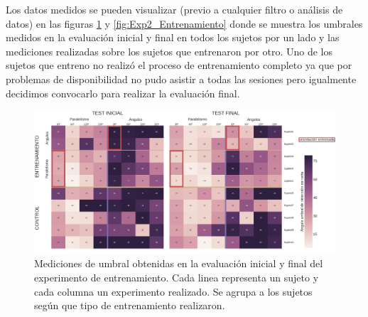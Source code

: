 \documentclass{article}
\begin{document}
    Los datos medidos se pueden visualizar (previo a cualquier filtro o análisis de datos) en las figuras \ref{fig:Exp2_Test} y \ref{fig:Exp2_Entrenamiento} donde se muestra los umbrales medidos en la evaluación inicial y final en todos los sujetos por un lado y las mediciones realizadas sobre los sujetos que entrenaron por otro. Uno de los sujetos que entreno no realizó el proceso de entrenamiento completo ya que por problemas de disponibilidad no pudo asistir a todas las sesiones pero igualmente decidimos convocarlo para realizar la evaluación final. 

                                                    
    \begin{figure}
        \center
        \includegraphics[width=\textwidth]{Imagenes/TransferenciaHeatmap.png}
        \caption{Mediciones de umbral obtenidas en la evaluación inicial y final del experimento de entrenamiento. Cada linea representa un sujeto y cada columna un experimento realizado. Se agrupa a los sujetos según que tipo de entrenamiento realizaron.}
        \label{fig:Exp2_Test}
    \end{figure}  
    
\end{document}
